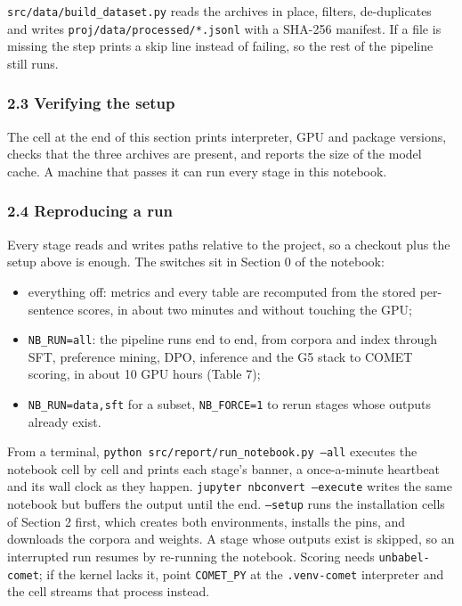 \documentclass[a4paper,12pt,oneside]{article}
\begin{document}
\texttt{src/data/build\_dataset.py} reads the archives in place, filters, de-duplicates and writes
\texttt{proj/data/processed/*.jsonl} with a SHA-256 manifest. If a file is missing the step prints a
skip line instead of failing, so the rest of the pipeline still runs.

\subsubsection*{2.3 Verifying the setup}

The cell at the end of this section prints interpreter, GPU and package versions, checks that the
three archives are present, and reports the size of the model cache. A machine that passes it can
run every stage in this notebook.

\subsubsection*{2.4 Reproducing a run}

Every stage reads and writes paths relative to the project, so a checkout plus the setup above is
enough. The switches sit in Section 0 of the notebook:

\begin{itemize}\setlength{\itemsep}{2pt}
  \item everything off: metrics and every table are recomputed from the stored per-sentence scores, in about two minutes and without touching the GPU;
  \item \texttt{NB\_RUN=all}: the pipeline runs end to end, from corpora and index through SFT, preference mining, DPO, inference and the G5 stack to COMET scoring, in about 10 GPU hours (Table 7);
  \item \texttt{NB\_RUN=data,sft} for a subset, \texttt{NB\_FORCE=1} to rerun stages whose outputs already exist.
\end{itemize}

From a terminal, \texttt{python src/report/run\_notebook.py --all} executes the notebook cell by cell and
prints each stage's banner, a once-a-minute heartbeat and its wall clock as they happen.
\texttt{jupyter nbconvert --execute} writes the same notebook but buffers the output until the end.
\texttt{--setup} runs the installation cells of Section 2 first, which creates both environments,
installs the pins, and downloads the corpora and weights. A stage whose outputs exist is skipped,
so an interrupted run resumes by re-running the notebook.
Scoring needs \texttt{unbabel-comet}; if the kernel lacks it, point \texttt{COMET\_PY} at the \texttt{.venv-comet}
interpreter and the cell streams that process instead.
\end{document}
